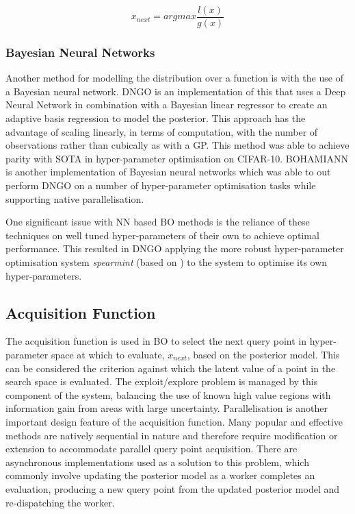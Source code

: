 \documentclass{article}
\begin{document}
			\begin{equation}\label{eq:TPE2} x_{next} = argmax \frac{l(x)}{g(x)}\end{equation}


		\subsubsection{Bayesian Neural Networks}

			Another method for modelling the distribution over a function is with the use of a Bayesian neural network. DNGO \cite{22} is an implementation of this that uses a Deep Neural Network in combination with a Bayesian linear regressor to create an adaptive basis regression to model the posterior. This approach has the advantage of scaling linearly, in terms of computation, with the number of observations rather than cubically as with a GP. This method was able to achieve parity with SOTA in hyper-parameter optimisation on CIFAR-10. BOHAMIANN \cite{40} is another implementation of Bayesian neural networks which was able to out perform DNGO on a number of hyper-parameter optimisation tasks while supporting native parallelisation. 
			\par
			One significant issue with NN based BO methods is the reliance of these techniques on well tuned hyper-parameters of their own to achieve optimal performance. This resulted in DNGO applying the more robust hyper-parameter optimisation system \textit{spearmint} (based on \cite{20}) to the system to optimise its own hyper-parameters.




	\subsection {Acquisition Function} \label{AF}

		The acquisition function is used in BO to select the next query point in hyper-parameter space at which to evaluate, \(x_{next}\), based on the posterior model. This can be considered the criterion against which the latent value of a point in the search space is evaluated. The exploit/explore problem is managed by this component of the system, balancing the use of known high value regions with information gain from areas with large uncertainty. Parallelisation is another important design feature of the acquisition function. Many popular and effective methods are natively sequential in nature and therefore require modification or extension to accommodate parallel query point acquisition. There are asynchronous implementations used as a solution to this problem, which commonly involve updating the posterior model as a worker completes an evaluation, producing a new query point from the updated posterior model and re-dispatching the worker. \cite{26}\cite{27}\cite{20}
\end{document}
